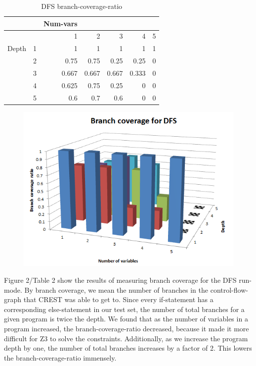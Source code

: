 \documentclass[oribibl]{llncs}
\begin{document}
\begin{table}[htbp]
\caption{DFS branch-coverage-ratio}
\begin{center}
\begin{tabular}{|l|r|r|r|r|r|r|}
\hline
 & \multicolumn{1}{l|}{} & \multicolumn{1}{l|}{Num-vars} & \multicolumn{1}{l|}{} & \multicolumn{1}{l|}{} & \multicolumn{1}{l|}{} & \multicolumn{1}{l|}{} \\ \hline
 & \multicolumn{1}{l|}{} & 1 & 2 & 3 & 4 & 5 \\ \hline
Depth & 1 & 1 & 1 & 1 & 1 & 1 \\ \hline
 & 2 & 0.75 & 0.75 & 0.25 & 0.25 & 0 \\ \hline
 & 3 & 0.667 & 0.667 & 0.667 & 0.333 & 0 \\ \hline
 & 4 & 0.625 & 0.75 & 0.25 & 0 & 0 \\ \hline
 & 5 & 0.6 & 0.7 & 0.6 & 0 & 0 \\ \hline
\end{tabular}
\end{center}
\label{DFS branch-coverage-ratio}
\end{table}


\begin{figure}[!t]
\centering
\includegraphics[width=13cm]{dfs_branch_coverage}
\caption{}
\label{figure:motivation}
\end{figure}

Figure 2/Table 2 show the results of measuring branch coverage for the DFS run-mode. By branch coverage, we mean the number of branches in the control-flow-graph that CREST was able to get to. Since every if-statement has a corresponding else-statement in our test set, the number of total branches for a given program is twice the depth. We found that as the number of variables in a program increased, the branch-coverage-ratio decreased, because it made it more difficult for Z3 to solve the constraints. Additionally, as we increase the program depth by one, the number of total branches increases by a factor of 2. This lowers the branch-coverage-ratio immensely.
\end{document}
